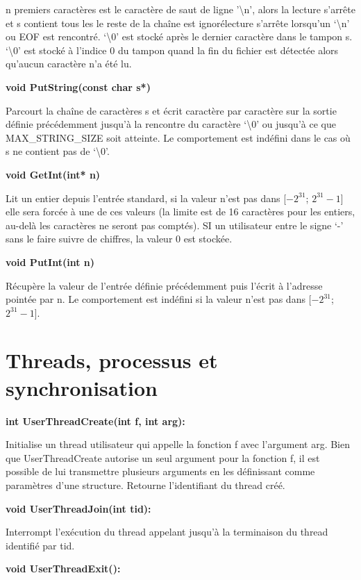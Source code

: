 \documentclass[12pt]{report}
\begin{document}
 n premiers caractères est le caractère de saut de ligne '\textbackslash n', alors la lecture s'arrête et s contient tous les le reste de la chaîne est ignorélecture s’arrête lorsqu’un ‘\textbackslash n’ ou EOF est rencontré.
‘\textbackslash 0’ est stocké après le dernier caractère dans le tampon s.
‘\textbackslash 0’ est stocké à l’indice 0 du tampon quand la fin du fichier est détectée alors qu’aucun caractère n’a été lu.

\textbf{void PutString(const char s*)}

Parcourt la chaîne de caractères s et écrit caractère par caractère sur la sortie définie précédemment jusqu’à la rencontre du caractère ‘\textbackslash 0’ ou jusqu’à ce que MAX\_STRING\_SIZE soit atteinte. Le comportement est indéfini dans le cas où s ne contient pas de ‘\textbackslash 0’.

\textbf{void GetInt(int* n)}

Lit un entier depuis l'entrée standard, si la valeur n'est pas dans [$-2^{31}$; $2^{31}-1$] elle sera forcée à une de ces valeurs (la limite est de 16 caractères pour les entiers, au-delà les caractères ne seront pas comptés). SI un utilisateur entre le signe ‘-’ sans le faire suivre de chiffres, la valeur 0 est stockée.

\textbf{void PutInt(int n)}

Récupère la valeur de l’entrée définie précédemment puis l’écrit à l’adresse pointée par n. Le comportement est indéfini si la valeur n'est pas dans [$-2^{31}$; $2^{31}-1$].

\bigskip

\section{Threads, processus et synchronisation}
\bigskip

\textbf{int UserThreadCreate(int f, int arg):}

Initialise un thread utilisateur qui appelle la fonction f avec l'argument arg. Bien que UserThreadCreate autorise un seul argument pour la fonction f, il est possible de lui transmettre plusieurs arguments en les définissant comme paramètres d'une structure.
Retourne l’identifiant du thread créé.
\bigskip

\textbf{void UserThreadJoin(int tid):}

Interrompt l'exécution du thread appelant jusqu'à la terminaison du thread identifié par tid.
\bigskip


\textbf{void UserThreadExit():}
\end{document}
